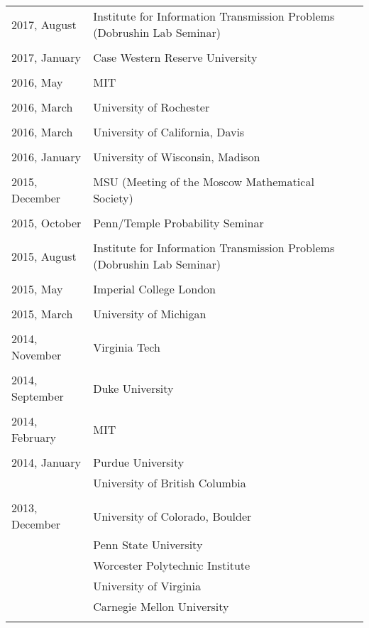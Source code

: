 \documentclass[letterpaper,11pt]{article}
\begin{document}
\begin{longtable}{llc}
	2017, August
	& Institute for Information Transmission Problems
	(Dobrushin Lab Seminar)
	\\\\
	2017, January
	& Case Western Reserve University
	\\\\
	2016, May
	& MIT
	\\\\
	2016, March
	& University of Rochester
	\\\\
	2016, March
	& University of California, Davis
	\\\\
	2016, January
	& University of Wisconsin, Madison
	\\\\
	2015, December
	& MSU (Meeting of the Moscow Mathematical Society)
	\\\\
	2015, October
	& Penn/Temple Probability Seminar
	\\\\

	2015, August
	& Institute for Information Transmission Problems
	(Dobrushin Lab Seminar)
	\\\\

	2015, May
	& Imperial College London
	\\\\

	2015, March
	& University of Michigan
	\\\\

	2014, November
	& Virginia Tech\\\\

	2014, September
	& Duke University\\\\

	2014, February
	& MIT\\\\

	2014, January
	  & Purdue University & \hspace{110pt}
	\\& University of British Columbia \\\\

	2013, December
	& University of Colorado, Boulder
	\\&Penn State University\\&Worcester Polytechnic Institute
	\\&University of Virginia\\&
	Carnegie Mellon University \\\\


\end{longtable}
\end{document}
